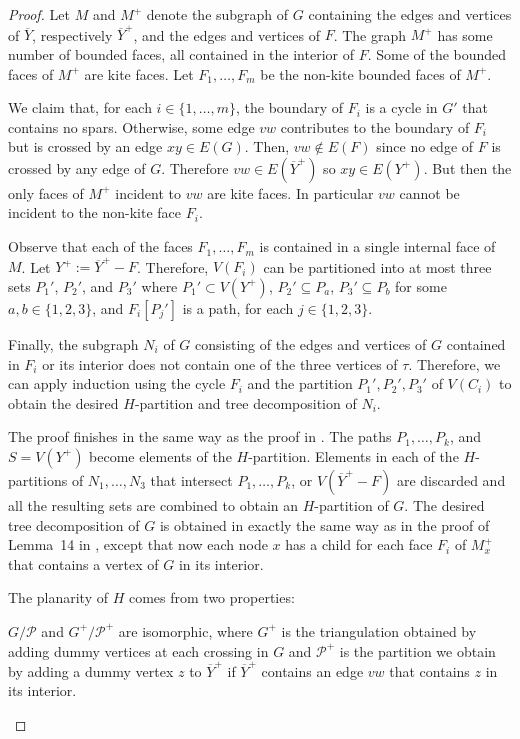 \documentclass{patmorin}
\newcommand{\note}[2]{\noindent{\color{red}[#1:~#2]}}
\begin{document}
\begin{proof}
	Let $M$ and $M^+$ denote the subgraph of $G$ containing the edges and vertices of $\overline{Y}$, respectively $\overline{Y}^+$, and the edges and vertices of $F$.  The graph $M^+$ has some number of bounded faces, all contained in the interior of $F$. Some of the bounded faces of $M^+$ are kite faces. Let $F_1,\ldots,F_m$ be the non-kite bounded faces of $M^+$.
	
	We claim that, for each $i\in\{1,\ldots,m\}$, the boundary of $F_i$ is a cycle in $G'$ that contains no spars. Otherwise, some edge $vw$ contributes to the boundary of $F_i$ but is crossed by an edge $xy\in E(G)$. Then, $vw\not\in E(F)$ since no edge of $F$ is crossed by any edge of $G$. Therefore $vw\in E(\overline{Y}^+)$ so $xy\in E(Y^+)$. But then the only faces of $M^+$ incident to $vw$ are kite faces.  In particular $vw$ cannot be incident to the non-kite face $F_i$.
	
	Observe that each of the faces $F_1,\ldots,F_m$ is contained in a single internal face of $M$.   Let $Y^+ := \overline{Y}^+-F$. Therefore, $V(F_i)$ can be partitioned into at most three sets $P_1'$, $P_2'$, and $P_3'$ where $P_1'\subset V(Y^+)$, $P_2'\subseteq P_a$, $P_3'\subseteq P_b$ for some $a,b\in\{1,2,3\}$, and $F_i[P_j']$ is a path, for each $j\in\{1,2,3\}$.
	
	Finally, the subgraph $N_i$ of $G$ consisting of the edges and vertices of $G$ contained in $F_i$ or its interior does not contain one of the three vertices of $\tau$. Therefore, we can apply induction using the cycle $F_i$ and the partition $P_1',P_2',P_3'$ of $V(C_i)$ to obtain the desired $H$-partition and tree decomposition of $N_i$.
	
	The proof finishes in the same way as the proof in \cite{DJMMUW20}.  The paths $P_1,\ldots,P_k$, and $S=V(Y^+)$ become elements of the $H$-partition.
	Elements in each of the $H$-partitions of $N_1,\ldots,N_3$ that intersect $P_1,\ldots,P_k$, or $V(\overline{Y}^+-F)$ are discarded and all the resulting sets are combined to obtain an $H$-partition of $G$.  The desired tree decomposition of $G$ is obtained in exactly the same way as in the proof of Lemma~14 in \cite{DJMMUW20}, except that now each node $x$ has a child for each face $F_i$ of $M^+_x$ that contains a vertex of $G$ in its interior.
	
	\note{DW}{Check whether Lemma~14 is the right lemma}
	
	The planarity of $H$ comes from two properties:
	\begin{compactenum}
		\item $G/\mathcal{P}$ and $G^+/\mathcal{P^+}$ are isomorphic, where $G^+$ is the triangulation obtained by adding dummy vertices at each crossing in $G$ and $\mathcal{P}^+$ is the partition we obtain by adding a dummy vertex $z$ to $\overline{Y}^+$ if $\overline{Y}^+$ contains an edge $vw$ that contains $z$ in its interior.
		

\end{compactenum}
\end{proof}
\end{document}
